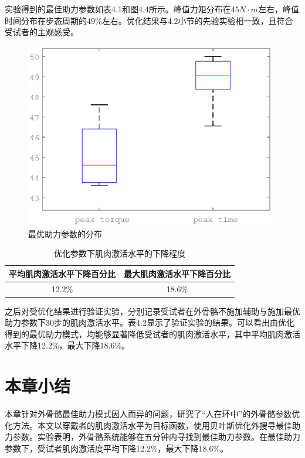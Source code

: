 实验得到的最佳助力参数如表4.1和图4.4所示。峰值力矩分布在$45N\cdot m$左右，峰值时间分布在步态周期的$49\%$左右。优化结果与4.2小节的先验实验相一致，且符合受试者的主观感受。
\begin{figure}[htb]
    \includegraphics[width=11cm]{fig/f64.eps}
    \caption{最优助力参数的分布}
    \label{fig:mark}
\end{figure}

\begin{table}[!htb]
    \caption[控制参数]{优化参数下肌肉激活水平的下降程度}
    \begin{tabular}{cc}
      \toprule
      平均肌肉激活水平下降百分比 & 最大肌肉激活水平下降百分比 \\
      \midrule
        12.2\% & 18.6\% \\
      \bottomrule
    \end{tabular}
\end{table}

之后对受优化结果进行验证实验，分别记录受试者在外骨骼不施加辅助与施加最优助力参数下30步的肌肉激活水平。表4.2显示了验证实验的结果。可以看出由优化得到的最优助力模式，均能够显著降低受试者的肌肉激活水平，其中平均肌肉激活水平下降12.2\%，最大下降18.6\%。

\section{本章小结}

本章针对外骨骼最佳助力模式因人而异的问题，研究了“人在环中”的外骨骼参数优化方法。本文以穿戴者的肌肉激活水平为目标函数，使用贝叶斯优化外搜寻最佳助力参数。实验表明，外骨骼系统能够在五分钟内寻找到最佳助力参数。在最佳助力参数下，受试者肌肉激活度平均下降12.2\%，最大下降18.6\%。